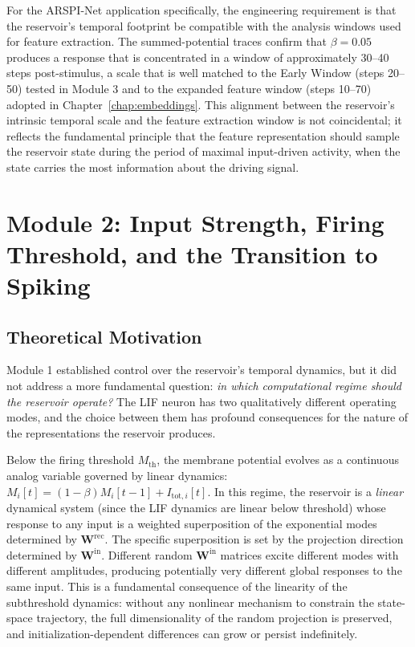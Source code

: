 For the ARSPI-Net application specifically, the engineering requirement is that the reservoir's temporal footprint be compatible with the analysis windows used for feature extraction. The summed-potential traces confirm that $\beta = 0.05$ produces a response that is concentrated in a window of approximately 30--40 steps post-stimulus, a scale that is well matched to the Early Window (steps 20--50) tested in Module 3 and to the expanded feature window (steps 10--70) adopted in Chapter~\ref{chap:embeddings}. This alignment between the reservoir's intrinsic temporal scale and the feature extraction window is not coincidental; it reflects the fundamental principle that the feature representation should sample the reservoir state during the period of maximal input-driven activity, when the state carries the most information about the driving signal.


\section{Module 2: Input Strength, Firing Threshold, and the Transition to Spiking}
\label{sec:module2}

\subsection{Theoretical Motivation}

Module 1 established control over the reservoir's temporal dynamics, but it did not address a more fundamental question: \emph{in which computational regime should the reservoir operate?} The LIF neuron has two qualitatively different operating modes, and the choice between them has profound consequences for the nature of the representations the reservoir produces.

Below the firing threshold $M_{\text{th}}$, the membrane potential evolves as a continuous analog variable governed by linear dynamics: $M_i[t] = (1 - \beta) M_i[t-1] + I_{\text{tot},i}[t]$. In this regime, the reservoir is a \emph{linear} dynamical system (since the LIF dynamics are linear below threshold) whose response to any input is a weighted superposition of the exponential modes determined by $\mathbf{W}^{\text{rec}}$. The specific superposition is set by the projection direction determined by $\mathbf{W}^{\text{in}}$. Different random $\mathbf{W}^{\text{in}}$ matrices excite different modes with different amplitudes, producing potentially very different global responses to the same input. This is a fundamental consequence of the linearity of the subthreshold dynamics: without any nonlinear mechanism to constrain the state-space trajectory, the full dimensionality of the random projection is preserved, and initialization-dependent differences can grow or persist indefinitely.


